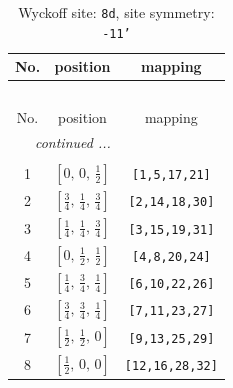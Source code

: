 \documentclass[fleqn,8pt]{jsarticle}
\begin{document}
\begin{longtable}{ccc}
\caption{Wyckoff site: {\tt 8d}, site symmetry: {\tt -11'}}
 \\
 \hline \hline
No. & position & mapping \\ \hline \endfirsthead

\multicolumn{2}{l}{\tablename\ \thetable{}} \\
 \hline \hline
No. & position & mapping \\ \hline \endhead

 \hline \hline
\multicolumn{2}{r}{\footnotesize\it continued ...} \\ \endfoot

 \hline \hline
\multicolumn{2}{r}{} \\ \endlastfoot

1 & $\left[ 0,\, 0,\, \frac{1}{2} \right]$ & {\tt [1,5,17,21]} \\ \hline
2 & $\left[ \frac{3}{4},\, \frac{1}{4},\, \frac{3}{4} \right]$ & {\tt [2,14,18,30]} \\ \hline
3 & $\left[ \frac{1}{4},\, \frac{1}{4},\, \frac{3}{4} \right]$ & {\tt [3,15,19,31]} \\ \hline
4 & $\left[ 0,\, \frac{1}{2},\, \frac{1}{2} \right]$ & {\tt [4,8,20,24]} \\ \hline
5 & $\left[ \frac{1}{4},\, \frac{3}{4},\, \frac{1}{4} \right]$ & {\tt [6,10,22,26]} \\ \hline
6 & $\left[ \frac{3}{4},\, \frac{3}{4},\, \frac{1}{4} \right]$ & {\tt [7,11,23,27]} \\ \hline
7 & $\left[ \frac{1}{2},\, \frac{1}{2},\, 0 \right]$ & {\tt [9,13,25,29]} \\ \hline
8 & $\left[ \frac{1}{2},\, 0,\, 0 \right]$ & {\tt [12,16,28,32]} \\
\end{longtable}
\renewcommand{\arraystretch}{1.2}
\end{document}
